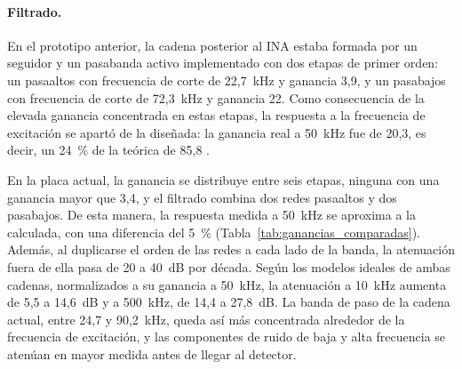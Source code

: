 \documentclass[12pt,a4paper]{article}
\begin{document}
\paragraph{Filtrado.}
En el prototipo anterior, la cadena posterior al INA estaba formada por un seguidor y un
pasabanda activo implementado con dos etapas de primer orden: un pasaaltos con frecuencia de
corte de 22,7~kHz y ganancia 3,9, y un pasabajos con frecuencia de corte de 72,3~kHz y ganancia
22. Como consecuencia de la elevada ganancia concentrada en estas etapas, la respuesta a la
frecuencia de excitación se apartó de la diseñada: la ganancia real a 50~kHz fue de 20,3, es
decir, un 24~\% de la teórica de 85,8 \cite{informe_grupo2_2025}.

En la placa actual, la ganancia se distribuye entre seis etapas, ninguna con una ganancia mayor
que 3,4, y el filtrado combina dos redes pasaaltos y dos pasabajos. De esta manera, la respuesta
medida a 50~kHz se aproxima a la calculada, con una diferencia del 5~\%
(Tabla~\ref{tab:ganancias_comparadas}). Además, al duplicarse el orden de las
redes a cada lado de la banda, la atenuación fuera de ella pasa de 20 a 40~dB por década. Según
los modelos ideales de ambas cadenas, normalizados a su ganancia a 50~kHz, la atenuación a
10~kHz aumenta de 5,5 a 14,6~dB y a 500~kHz, de 14,4 a 27,8~dB. La banda de paso de la cadena
actual, entre 24,7 y 90,2~kHz, queda así más concentrada alrededor de la frecuencia de
excitación, y las componentes de ruido de baja y alta frecuencia se atenúan en mayor medida antes
de llegar al detector.
\end{document}
